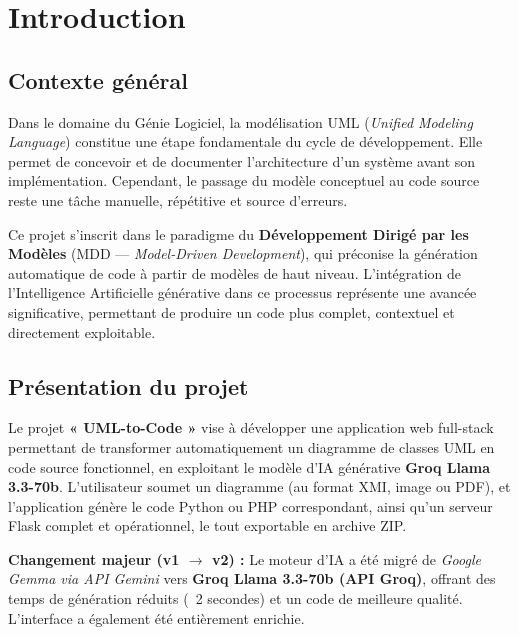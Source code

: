 \documentclass[12pt,a4paper]{article}
\begin{document}



\tableofcontents
\newpage

\section{Introduction}

\subsection{Contexte général}

Dans le domaine du Génie Logiciel, la modélisation UML (\textit{Unified Modeling Language}) constitue une étape fondamentale du cycle de développement. Elle permet de concevoir et de documenter l'architecture d'un système avant son implémentation. Cependant, le passage du modèle conceptuel au code source reste une tâche manuelle, répétitive et source d'erreurs.

Ce projet s'inscrit dans le paradigme du \textbf{Développement Dirigé par les Modèles} (MDD — \textit{Model-Driven Development}), qui préconise la génération automatique de code à partir de modèles de haut niveau. L'intégration de l'Intelligence Artificielle générative dans ce processus représente une avancée significative, permettant de produire un code plus complet, contextuel et directement exploitable.

\subsection{Présentation du projet}

Le projet \textbf{« UML-to-Code »} vise à développer une application web full-stack permettant de transformer automatiquement un diagramme de classes UML en code source fonctionnel, en exploitant le modèle d'IA générative \textbf{Groq Llama 3.3-70b}. L'utilisateur soumet un diagramme (au format XMI, image ou PDF), et l'application génère le code Python ou PHP correspondant, ainsi qu'un serveur Flask complet et opérationnel, le tout exportable en archive ZIP.

\begin{infobox}
  \textbf{Changement majeur (v1 $\rightarrow$ v2) :} Le moteur d'IA a été migré de \textit{Google Gemma via API Gemini} vers \textbf{Groq Llama 3.3-70b (API Groq)}, offrant des temps de génération réduits (~2 secondes) et un code de meilleure qualité. L'interface a également été entièrement enrichie.
\end{infobox}
\end{document}
